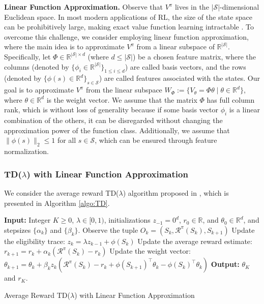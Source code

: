\documentclass[11 pt]{article}
\begin{document}
	\vspace{3 mm}
	\noindent\textbf{Linear Function Approximation.} Observe that $V^\pi$ lives in the $|\mathcal{S}|$-dimensional Euclidean space. In most modern applications of RL, the size of the state space can be prohibitively large, making exact value function learning intractable \cite{sutton2018reinforcement}. To overcome this challenge, we consider employing linear function approximation, where the main idea is to approximate $V^\pi$ from a linear subspace of $\mathbb{R}^{|\mathcal{S}|}$. Specifically, let $\Phi\in\mathbb{R}^{|\mathcal{S}|\times d}$ (where $d \leq |\mathcal{S}|$) be a chosen feature matrix, where the columns (denoted by $\{\phi_i\in\mathbb{R}^{|\mathcal{S}|}\}_{1\leq i\leq d}$) are called basis vectors, and the rows (denoted by $\{\phi(s)\in\mathbb{R}^d\}_{s\in\mathcal{S}}$) are called features associated with the states. Our goal is to approximate $V^\pi$ from the linear subspace $W_\Phi:=\{V_\theta=\Phi\theta\mid \theta\in\mathbb{R}^d\}$, where $\theta\in\mathbb{R}^d$ is the weight vector. We assume that the matrix $\Phi$ has full column rank, which is without loss of generality because if some basis vector $\phi_i$ is a linear combination of the others, it can be disregarded without changing the approximation power of the function class. Additionally, we assume that $\|\phi(s)\|_2 \leq 1$ for all $s \in \mathcal{S}$, which can be ensured through feature normalization.
	
	
	\subsubsection{TD(\texorpdfstring{$\lambda$}{lambda}) with Linear Function Approximation}\label{subsubsec:TD_Algorithm}
	
	We consider the average reward TD($\lambda$) algorithm proposed in \cite{tsitsiklis1999average}, which is presented in Algorithm \ref{algo:TD}. 
	
	
	\begin{algorithm}[ht]
		\begin{algorithmic}[1]
			\STATE \textbf{Input:} Integer $K\geq 0$, $\lambda \in [0,1)$,  initializations $z_{-1} = 0^d$, $r_0\in\mathbb{R}$, and $\theta_0\in\mathbb{R}^d$, and stepsizes $\{\alpha_k\}$ and $\{\beta_k\}$.
			\STATE Observe the tuple  $O_k = (S_k,\mathcal{R}^\pi(S_k),S_{k+1})$
			\STATE Update the eligibility trace: $z_k = \lambda z_{k-1} + \phi(S_k)$
			\STATE Update the average reward estimate: $r_{k+1} = r_k + \alpha_k (\mathcal{R}^\pi(S_k) - r_k)$
			\STATE Update the weight vector: $\theta_{k+1} = \theta_k + \beta_k z_k(\mathcal{R}^\pi(S_k) - r_k + \phi(S_{k+1})^\top \theta_k - \phi(S_k)^\top \theta_k)$
			\ENDFOR
			\STATE \textbf{Output:} $\theta_K$ and $r_K$.
		\end{algorithmic}
		\caption{Average Reward TD($\lambda$) with Linear Function Approximation} 
		\label{algo:TD}
	\end{algorithm} 
	
\end{document}

